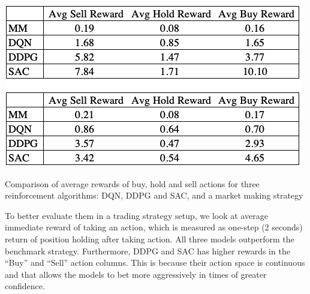 \documentclass{article}
\begin{document}
\begin{table}[h]
	\includegraphics[width=\linewidth]{rl_avg_perf.png}
	\caption{Comparison of average rewards of buy, hold and sell actions for three reinforcement algorithms: DQN, DDPG and SAC, and a market making strategy}
	\label{tab:rl_avg_perf}
\end{table}
To better evaluate them in a trading strategy setup, we look at average immediate reward of taking an action, which is measured as one-step (2 seconds) return of position holding after taking action. All three models outperform the benchmark strategy. Furthermore, DDPG and SAC has higher rewards in the “Buy” and “Sell” action columns. This is because their action space is continuous and that allows the models to bet more aggressively in times of greater confidence.
\end{document}
